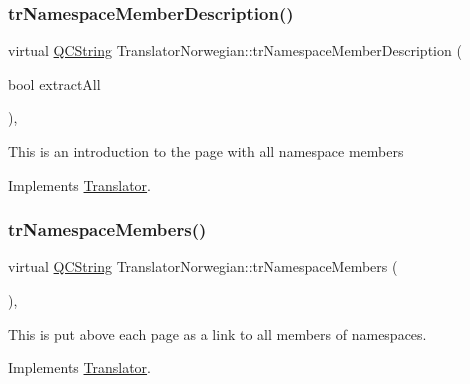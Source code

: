 \mbox{\label{class_translator_norwegian_ac3e851e771f6d68cd6e1b8927b3af0d5}} 
\subsubsection{\texorpdfstring{trNamespaceMemberDescription()}{trNamespaceMemberDescription()}}
{\footnotesize\ttfamily virtual \mbox{\hyperlink{class_q_c_string}{Q\+C\+String}} Translator\+Norwegian\+::tr\+Namespace\+Member\+Description (\begin{DoxyParamCaption}\item[{bool}]{extract\+All }\end{DoxyParamCaption})\hspace{0.3cm}{\ttfamily [inline]}, {\ttfamily [virtual]}}

This is an introduction to the page with all namespace members 

Implements \mbox{\hyperlink{class_translator}{Translator}}.

\mbox{\label{class_translator_norwegian_ae84636b174085a859d8148f19f9269af}} 
\subsubsection{\texorpdfstring{trNamespaceMembers()}{trNamespaceMembers()}}
{\footnotesize\ttfamily virtual \mbox{\hyperlink{class_q_c_string}{Q\+C\+String}} Translator\+Norwegian\+::tr\+Namespace\+Members (\begin{DoxyParamCaption}{ }\end{DoxyParamCaption})\hspace{0.3cm}{\ttfamily [inline]}, {\ttfamily [virtual]}}

This is put above each page as a link to all members of namespaces. 

Implements \mbox{\hyperlink{class_translator}{Translator}}.

\mbox{\label{class_translator_norwegian_a0537fbc1fa13ccd1fa75f890f067f2ca}} 
